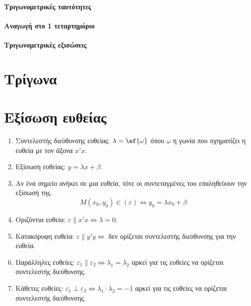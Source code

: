 \paragraph{Τριγωνομετρικές ταυτότητες}
\paragraph{Αναγωγή στο 1 τεταρτημόριο}
\paragraph{Τριγωνομετρικές εξισώσεις}
\section{Τρίγωνα}
\section{Εξίσωση ευθείας}
\begin{enumerate}
\item Συντελεστής διεύθυνσης ευθείας: $\lambda=\ef{\omega}$ όπου $\omega$ η γωνία που σχηματίζει η ευθεία με τον άξονα $x'x$.
\item Εξίσωση ευθείας: $y=\lambda x+\beta$.
\item Αν ένα σημείο ανήκει σε μια ευθεία, τότε οι συντεταγμένες του επαληθεύουν την εξίσωσή της.
\[ M(x_0,y_0)\in(\varepsilon)\Leftrightarrow y_0=\lambda x_0+\beta \]
\item Οριζόντια ευθεία: $\varepsilon\parallel x'x\Leftrightarrow \lambda=0$.
\item Κατακόρυφη ευθεία: $\varepsilon\parallel y'y\Leftrightarrow $ δεν ορίζεται συντελεστής διεύθυνσης για την ευθεία.
\item Παράλληλες ευθείες: $\varepsilon_1\parallel\varepsilon_2\Leftrightarrow \lambda_1=\lambda_2$ αρκεί για τις ευθείες να ορίζεται συντελεστής διεύθυνσης.
\item Κάθετες ευθείες: $\varepsilon_1\perp\varepsilon_2\Leftrightarrow \lambda_1\cdot\lambda_2=-1$ αρκεί για τις ευθείες να ορίζεται συντελεστής διεύθυνσης.
\end{enumerate}
